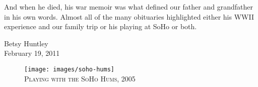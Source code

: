 And when he died, his war memoir was what defined our father and grandfather in his own words. Almost all of the many obituaries highlighted either his WWII experience and our family trip or his playing at SoHo or both.

\begin{flushright}
Betsy Huntley\\
February 19, 2011
\end{flushright}


\begin{figure}[h]
\centering
\texttt{[image: images/soho-hums]}\\
\medskip
{\newtimes\textsc{Playing with the SoHo Hums, 2005}}
\end{figure}

\clearpage
